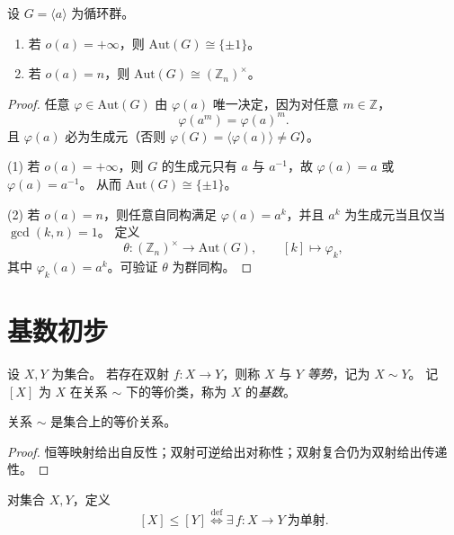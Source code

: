 \documentclass[lang=cn,a4paper,newtx]{elegantbook}
\begin{document}
\begin{proposition}[循环群的自同构群]
  设 $G=\langle a\rangle$ 为循环群。
  \begin{enumerate}
    \item 若 $o(a)=+\infty$，则 $\mathrm{Aut}(G)\cong \{\pm 1\}$。
    \item 若 $o(a)=n$，则 $\mathrm{Aut}(G)\cong (\mathbb{Z}_n)^{\times}$。
  \end{enumerate}
\end{proposition}

\begin{proof}
  任意 $\varphi\in\mathrm{Aut}(G)$ 由 $\varphi(a)$ 唯一决定，因为对任意 $m\in\mathbb{Z}$，
  \[
    \varphi(a^m)=\varphi(a)^m.
  \]
  且 $\varphi(a)$ 必为生成元（否则 $\varphi(G)=\langle\varphi(a)\rangle\ne G$）。

  (1) 若 $o(a)=+\infty$，则 $G$ 的生成元只有 $a$ 与 $a^{-1}$，故 $\varphi(a)=a$ 或 $\varphi(a)=a^{-1}$。
  从而 $\mathrm{Aut}(G)\cong \{\pm 1\}$。

  (2) 若 $o(a)=n$，则任意自同构满足 $\varphi(a)=a^k$，并且 $a^k$ 为生成元当且仅当 $\gcd(k,n)=1$。
  定义
  \[
    \theta:(\mathbb{Z}_n)^{\times}\to \mathrm{Aut}(G),\qquad [k]\mapsto \varphi_k,
  \]
  其中 $\varphi_k(a)=a^k$。可验证 $\theta$ 为群同构。
\end{proof}

\section{基数初步}

\begin{definition}[等势与基数]
  设 $X,Y$ 为集合。
  若存在双射 $f:X\to Y$，则称 $X$ 与 $Y$ \emph{等势}，记为 $X\sim Y$。
  记 $[X]$ 为 $X$ 在关系 $\sim$ 下的等价类，称为 $X$ 的\emph{基数}。
\end{definition}

\begin{proposition}
  关系 $\sim$ 是集合上的等价关系。
\end{proposition}

\begin{proof}
  恒等映射给出自反性；双射可逆给出对称性；双射复合仍为双射给出传递性。
\end{proof}

\begin{definition}[基数的偏序]
  对集合 $X,Y$，定义
  \[
    [X]\le [Y]\stackrel{\mathrm{def}}{\Longleftrightarrow}\exists\,f:X\to Y\ \text{为单射}.
  \]
\end{definition}
\end{document}
